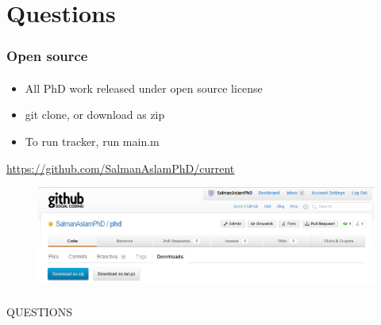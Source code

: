 \section{Questions}
\begin{frame}
\frametitle{Open source}
\framesubtitle{}
\logoCSIPCPL\mypagenum
\setcounter{subfigure}{0}
\begin{itemize}
\item All PhD work released under open source license
\item git clone, or download as zip
\item To run tracker, run main.m
\end{itemize}
\vspace{0.3in}
\color{blue}\underline{\url{https://github.com/SalmanAslamPhD/current}}
\begin{figure}
\includegraphics[width=1.0\textwidth]{thesis/github.png}
\end{figure}
\end{frame}

\begin{frame}
\frametitle{}
\logoCSIPCPL\mypagenum
		QUESTIONS
\end{frame}



